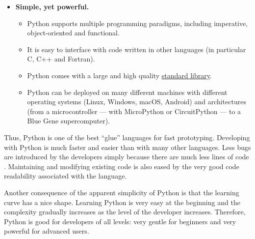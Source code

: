 \begin{itemize}
Note that there are many implementations of Python interpreters\footnote{We can
cite CPython (written in C), Jython (Java), IronPython (C\#), PyPy (Rpython, a
subset of Python) and MicroPython/CircuitPython (C, targeted to
micro-controllers).}. The default and most widely used implementation is written
in C and is called CPython.

\item \textbf{Simple, yet powerful.}

\begin{itemize}
\item Python supports multiple programming paradigms, including imperative,
object-oriented and functional.

\item It is easy to interface with code written in other languages (in particular
C, C++ and Fortran).

\item Python comes with a large and high quality \href{https://docs.python.org%
/3/library/index.html}{standard library}.

\item Python can be deployed on many different machines with different operating
systems (Linux, Windows, macOS, Android) and architectures (from a microcontroller
--- with MicroPython or CircuitPython --- to a Blue Gene supercomputer).

\end{itemize}
\end{itemize}

Thus, Python is one of the best ``glue'' languages for fast prototyping.
Developing with Python is much faster and easier than with many other
languages.  Less bugs are introduced by the developers simply because there are
much less lines of code \cite{nanz_comparative_2015}.
%
Maintaining and modifying existing code is also eased by the very good code
readability associated with the language.

Another consequence of the apparent simplicity of Python is that the learning
curve has a nice shape. Learning Python is very easy at the beginning and the
complexity gradually increases as the level of the developer increases.
%
Therefore, Python is good for developers of all levels: very gentle for
beginners and very powerful for advanced users.

